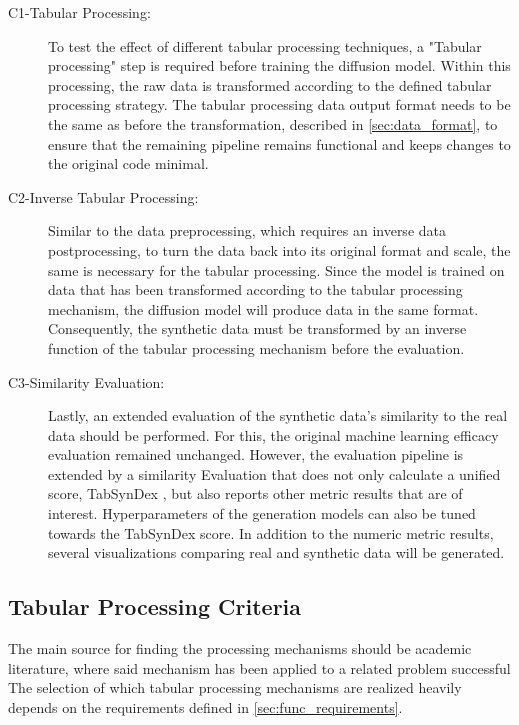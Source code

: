 \begin{description}
	\item[C1-Tabular Processing:] To test the effect of different tabular processing techniques, a "Tabular processing" step is required before training the diffusion model.
		Within this processing, the raw data is transformed according to the defined tabular processing strategy.
		The tabular processing data output format needs to be the same as before the transformation, described in \autoref{sec:data_format}, to ensure
		that the remaining pipeline remains functional and keeps changes to the original code minimal.
	\item[C2-Inverse Tabular Processing:] Similar to the data preprocessing, which requires an inverse data postprocessing, to turn the data back into its original format and scale, the same is necessary for the tabular processing.
		Since the model is trained on data that has been transformed according to the tabular processing mechanism, the diffusion model will produce data in the same format.
		Consequently, the synthetic data must be transformed by an inverse function of the tabular processing mechanism before the evaluation.
	\item[C3-Similarity Evaluation:] Lastly, an extended evaluation of the synthetic data's similarity to the real data should be performed.
		For this, the original machine learning efficacy evaluation remained unchanged.
		However, the evaluation pipeline is extended by a similarity Evaluation that does not only calculate a unified score, TabSynDex \cite{chundawat2022UniversalMetricRobust}, but also reports other metric results that are of interest.
		Hyperparameters of the generation models can also be tuned towards the TabSynDex score.
		In addition to the numeric metric results, several visualizations comparing real and synthetic data will be generated.
\end{description}

\subsection{Tabular Processing Criteria}
\label{ch:Concept-criteria}

The main source for finding the processing mechanisms should be academic literature, where said mechanism has been applied to a related problem successful
The selection of which tabular processing mechanisms are realized heavily depends on the requirements defined in \autoref{sec:func_requirements}.

